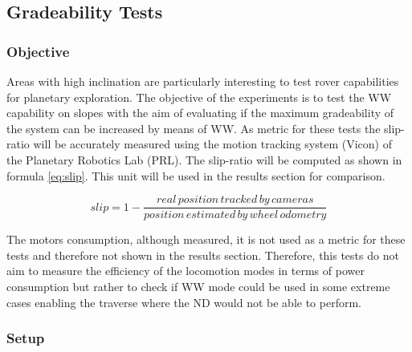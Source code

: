 \documentclass[a4paper,twocolumn]{esapub2005} %
\begin{document}

\subsection{Gradeability Tests}

\subsubsection{Objective}
Areas with high inclination are particularly interesting to test rover
capabilities for planetary exploration. The objective of the experiments is to test the WW capability on slopes with the aim of evaluating if the maximum gradeability of the system can be increased by means of WW. As metric for these tests the slip-ratio will be accurately measured using the motion tracking system (Vicon) of the Planetary Robotics Lab (PRL). The slip-ratio will be computed as shown in formula \ref{eq:slip}. This unit will be used in the results section for comparison.

\begin{equation} slip = 1- \frac{real\, position\, tracked\, by\,
cameras}{position\, estimated\, by\, wheel\, odometry} \label{eq:slip}
\end{equation}

The motors consumption, although measured, it is not used as a metric for these tests and therefore not shown in the results section. Therefore, this tests do not aim to measure the efficiency of the locomotion modes in terms of power consumption but rather to check if WW mode could be used in some extreme cases enabling the traverse where the ND would not be able to perform\footnotemark[2].


\subsubsection{Setup}
\end{document}

